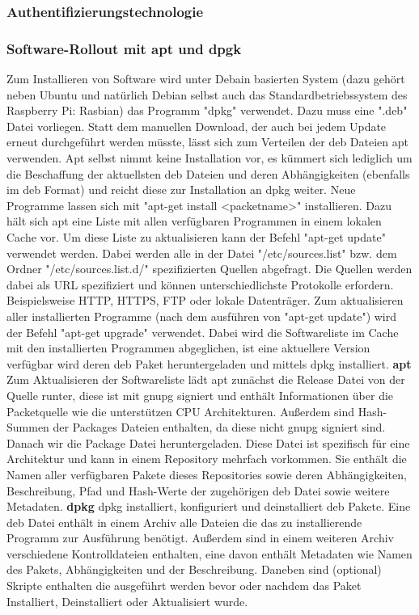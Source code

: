 \subsubsection{Authentifizierungstechnologie}
\subsubsection{Software-Rollout mit apt und dpgk}
Zum Installieren von Software wird unter Debain basierten System (dazu gehört neben Ubuntu und natürlich Debian selbst auch das Standardbetriebssystem des Raspberry Pi: Rasbian) das Programm "dpkg" verwendet.
Dazu muss eine ".deb" Datei vorliegen. Statt dem manuellen Download, der auch bei jedem Update erneut durchgeführt werden müsste, lässt sich zum Verteilen der deb Dateien apt verwenden.
Apt selbst nimmt keine Installation vor, es kümmert sich lediglich um die Beschaffung der aktuellsten deb Dateien und deren Abhängigkeiten (ebenfalls im deb Format) und reicht diese zur Installation an dpkg weiter.
Neue Programme lassen sich mit "apt-get install <packetname>" installieren.
Dazu hält sich apt eine Liste mit allen verfügbaren Programmen in einem lokalen Cache vor. Um diese Liste zu aktualisieren kann der Befehl "apt-get update" verwendet werden.
Dabei werden alle in der Datei "/etc/sources.list" bzw. dem Ordner "/etc/sources.list.d/" spezifizierten Quellen abgefragt.
Die Quellen werden dabei als URL spezifiziert und können unterschiedlichste Protokolle erfordern.
Beispielsweise HTTP, HTTPS, FTP oder lokale Datenträger.
Zum aktualisieren aller installierten Programme (nach dem ausführen von "apt-get update") wird der Befehl "apt-get upgrade" verwendet. Dabei wird die Softwareliste im Cache mit den installierten Programmen abgeglichen, ist eine aktuellere Version verfügbar wird deren deb Paket heruntergeladen und mittels dpkg installiert.
\newline\textbf{apt}\newline
Zum Aktualisieren der Softwareliste lädt apt zunächst die Release Datei von der Quelle runter, diese ist mit gnupg signiert und enthält Informationen über die Packetquelle wie die unterstützen CPU Architekturen.
Außerdem sind Hash-Summen der Packages Dateien enthalten, da diese nicht gnupg signiert sind.
Danach wir die Package Datei heruntergeladen. Diese Datei ist spezifisch für eine Architektur und kann in einem Repository mehrfach vorkommen.
Sie enthält die Namen aller verfügbaren Pakete dieses Repositories sowie deren Abhängigkeiten, Beschreibung, Pfad und Hash-Werte der zugehörigen deb Datei sowie weitere Metadaten.
\newline\textbf{dpkg}\newline
dpkg installiert, konfiguriert und deinstalliert deb Pakete.
Eine deb Datei enthält in einem Archiv alle Dateien die das zu installierende Programm zur Ausführung benötigt.
Außerdem sind in einem weiteren Archiv verschiedene Kontrolldateien enthalten, eine davon enthält Metadaten wie Namen des Pakets, Abhängigkeiten und der Beschreibung.
Daneben sind (optional) Skripte enthalten die ausgeführt werden bevor oder nachdem das Paket Installiert, Deinstalliert oder Aktualisiert wurde. 

